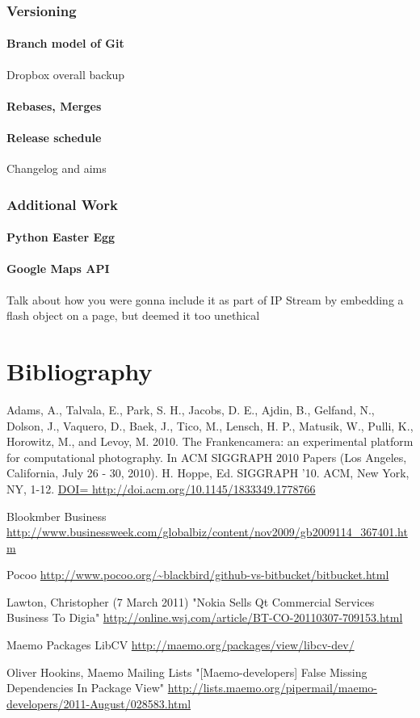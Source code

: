 \documentclass[11pt]{article} %
\begin{document}
\section{Versioning}
\subsection{Branch model of Git}{Dropbox overall backup}
\subsection{Rebases, Merges}
\subsection{Release schedule}{Changelog and aims}

\section{Additional Work}
\subsection{Python Easter Egg}
\subsection{Google Maps API}{Talk about how you were gonna include it as part of IP Stream by embedding a flash object on a page, but deemed it too unethical}

\part{Bibliography}
\begin{thebibliography}{9}

 Adams, A., Talvala, E., Park, S. H., Jacobs, D. E., Ajdin, B., Gelfand, N., Dolson, J., Vaquero, D., Baek, J., Tico, M., Lensch, H. P., Matusik, W., Pulli, K., Horowitz, M., and Levoy, M.
2010. The Frankencamera: an experimental platform for computational photography.
In ACM SIGGRAPH 2010 Papers (Los Angeles, California, July 26 - 30, 2010).
H. Hoppe, Ed. SIGGRAPH '10. ACM, New York, NY, 1-12.
\url{DOI= http://doi.acm.org/10.1145/1833349.1778766}

 Blookmber Business
\url{http://www.businessweek.com/globalbiz/content/nov2009/gb2009114_367401.htm}

 Pocoo
\url{http://www.pocoo.org/~blackbird/github-vs-bitbucket/bitbucket.html}

 Lawton, Christopher (7 March 2011)
"Nokia Sells Qt Commercial Services Business To Digia"
\url{http://online.wsj.com/article/BT-CO-20110307-709153.html}

 Maemo Packages
LibCV
\url{http://maemo.org/packages/view/libcv-dev/}

 Oliver Hookins, Maemo Mailing Lists
"[Maemo-developers] False Missing Dependencies In Package View"
\url{http://lists.maemo.org/pipermail/maemo-developers/2011-August/028583.html}


\end{thebibliography}
\end{document}

